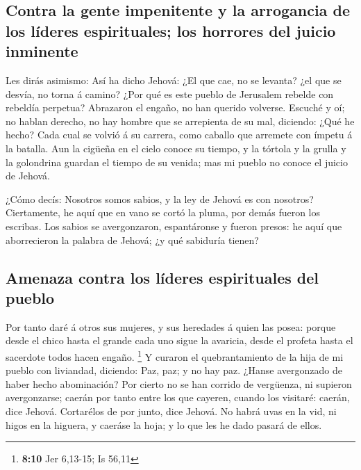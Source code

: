 \hypertarget{contra-la-gente-impenitente-y-la-arrogancia-de-los-luxedderes-espirituales-los-horrores-del-juicio-inminente}{%
\subsection{Contra la gente impenitente y la arrogancia de los líderes
espirituales; los horrores del juicio
inminente}\label{contra-la-gente-impenitente-y-la-arrogancia-de-los-luxedderes-espirituales-los-horrores-del-juicio-inminente}}

 Les dirás asimismo: Así ha dicho Jehová: ¿El que cae, no se
levanta? ¿el que se desvía, no torna á camino?  ¿Por qué es
este pueblo de Jerusalem rebelde con rebeldía perpetua? Abrazaron el
engaño, no han querido volverse.  Escuché y oí; no hablan
derecho, no hay hombre que se arrepienta de su mal, diciendo: ¿Qué he
hecho? Cada cual se volvió á su carrera, como caballo que arremete con
ímpetu á la batalla.  Aun la cigüeña en el cielo conoce su
tiempo, y la tórtola y la grulla y la golondrina guardan el tiempo de su
venida; mas mi pueblo no conoce el juicio de Jehová.

 ¿Cómo decís: Nosotros somos sabios, y la ley de Jehová es
con nosotros? Ciertamente, he aquí que en vano se cortó la pluma, por
demás fueron los escribas.  Los sabios se avergonzaron,
espantáronse y fueron presos: he aquí que aborrecieron la palabra de
Jehová; ¿y qué sabiduría tienen?

\hypertarget{amenaza-contra-los-luxedderes-espirituales-del-pueblo}{%
\subsection{Amenaza contra los líderes espirituales del
pueblo}\label{amenaza-contra-los-luxedderes-espirituales-del-pueblo}}

 Por tanto daré á otros sus mujeres, y sus heredades á
quien las posea: porque desde el chico hasta el grande cada uno sigue la
avaricia, desde el profeta hasta el sacerdote todos hacen engaño.
\footnote{\textbf{8:10} Jer 6,13-15; Is 56,11}  Y curaron
el quebrantamiento de la hija de mi pueblo con liviandad, diciendo: Paz,
paz; y no hay paz.  ¿Hanse avergonzado de haber hecho
abominación? Por cierto no se han corrido de vergüenza, ni supieron
avergonzarse; caerán por tanto entre los que cayeren, cuando los
visitaré: caerán, dice Jehová.  Cortarélos de por junto,
dice Jehová. No habrá uvas en la vid, ni higos en la higuera, y caeráse
la hoja; y lo que les he dado pasará de ellos.

